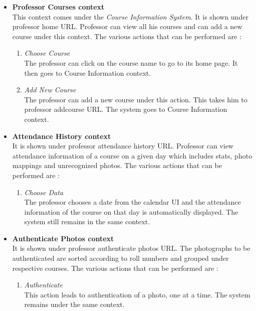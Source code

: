 \documentclass[paper=a4, fontsize=15pt]{scrartcl}
\begin{document}
\begin{itemize}
    \item \textbf{Professor Courses context}\\
    This context comes under the \textit{Course Information System}. It is shown under professor home URL. Professor can view all his courses and can add a new course under this context. The various actions that can be performed are : 
    \begin{enumerate}
        \item \textit{Choose Course}\\
        The professor can click on the course name to go to its home page. It then goes to Course Information context.
        
        \item \textit{Add New Course}\\
        The professor can add a new course under this action. This takes him to professor addcourse URL. The system goes to Course Information context.
        
    \end{enumerate}
        

    

    \item \textbf{Attendance History context}\\
    It is shown under professor attendance history URL. Professor can view attendance information of a course on a given day which includes stats, photo mappings and unrecognized photos. The various actions that can be performed are : 
    \begin{enumerate}
        \item \textit{Choose Data}\\
        The professor chooses a date from the calendar UI and the attendance information of the course on that day is automatically displayed. The system still remains in the same context.
        
    \end{enumerate}
        

    
    
  
    \item \textbf{Authenticate Photos context}\\
    It is shown under professor authenticate photos URL. The photographs to be authenticated are sorted according to roll numbers and grouped under respective courses. The various actions that can be performed are : 
    \begin{enumerate}
        \item \textit{Authenticate}\\
        This action leads to authentication of a photo, one at a time. The system remains under the same context.
        

\end{enumerate}
\end{itemize}
\end{document}
